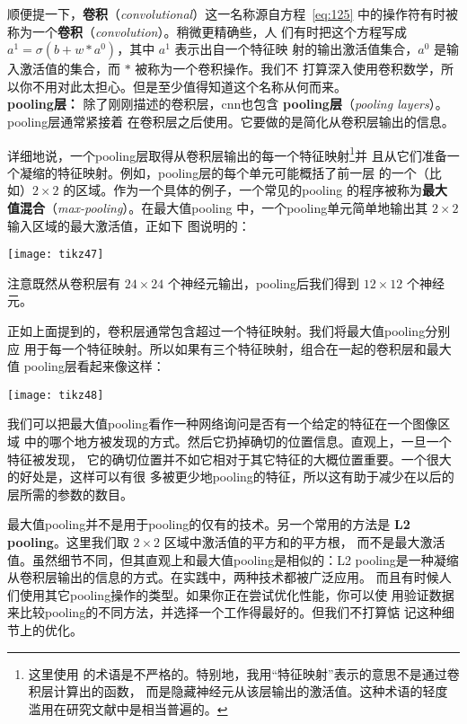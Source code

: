 顺便提一下，\textbf{卷积}（\textit{convolutional}）这一名称源自方程~\eqref{eq:125}
中的操作符有时被称为一个\textbf{卷积}（\textit{convolution}）。稍微更精确些，人
们有时把这个方程写成 $a^1 = \sigma(b + w * a^0)$，其中 $a^1$ 表示出自一个特征映
射的输出激活值集合，$a^0$ 是输入激活值的集合，而 $*$ 被称为一个卷积操作。我们不
打算深入使用卷积数学，所以你不用对此太担心。但是至少值得知道这个名称从何而来。\\

\textbf{\gls*{pooling}层：} 除了刚刚描述的卷积层，\gls*{cnn}也包含%
\textbf{\gls*{pooling}层}（\textit{pooling layers}）。\gls*{pooling}层通常紧接着
在卷积层之后使用。它要做的是简化从卷积层输出的信息。

详细地说，一个\gls*{pooling}层取得从卷积层输出的每一个特征映射\footnote{这里使用
  的术语是不严格的。特别地，我用“特征映射”表示的意思不是通过卷积层计算出的函数，
  而是隐藏神经元从该层输出的激活值。这种术语的轻度滥用在研究文献中是相当普遍的。}并
且从它们准备一个凝缩的特征映射。例如，\gls*{pooling}层的每个单元可能概括了前一层
的一个（比如）$2 \times 2$ 的区域。作为一个具体的例子，一个常见的\gls*{pooling}
的程序被称为\textbf{最大值混合}（\textit{max-pooling}）。在最大值\gls*{pooling}
中，一个\gls*{pooling}单元简单地输出其 $2 \times 2$ 输入区域的最大激活值，正如下
图说明的：
\begin{center}
  \texttt{[image: tikz47]}
\end{center}
注意既然从卷积层有 $24 \times 24$ 个神经元输出，\gls*{pooling}后我们得到 $12
\times 12$ 个神经元。

正如上面提到的，卷积层通常包含超过一个特征映射。我们将最大值\gls*{pooling}分别应
用于每一个特征映射。所以如果有三个特征映射，组合在一起的卷积层和最大值%
\gls*{pooling}层看起来像这样：
\begin{center}
  \texttt{[image: tikz48]}  
\end{center}

我们可以把最大值\gls*{pooling}看作一种网络询问是否有一个给定的特征在一个图像区域
中的哪个地方被发现的方式。然后它扔掉确切的位置信息。直观上，一旦一个特征被发现，
它的确切位置并不如它相对于其它特征的大概位置重要。一个很大的好处是，这样可以有很
多被更少地\gls*{pooling}的特征，所以这有助于减少在以后的层所需的参数的数目。

最大值\gls*{pooling}并不是用于\gls*{pooling}的仅有的技术。另一个常用的方法是
\textbf{L2 \gls*{pooling}}。这里我们取 $2 \times 2$ 区域中激活值的平方和的平方根，
而不是最大激活值。虽然细节不同，但其直观上和最大值\gls*{pooling}是相似的：L2
\gls*{pooling}是一种凝缩从卷积层输出的信息的方式。在实践中，两种技术都被广泛应用。
而且有时候人们使用其它\gls*{pooling}操作的类型。如果你正在尝试优化性能，你可以使
用验证数据来比较\gls*{pooling}的不同方法，并选择一个工作得最好的。但我们不打算惦
记这种细节上的优化。\\

